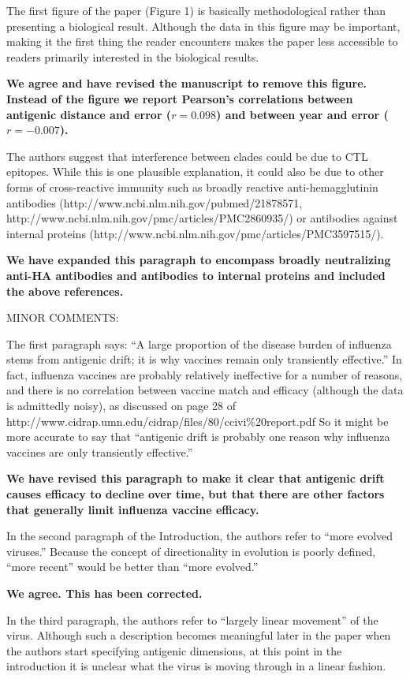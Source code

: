 \documentclass[11pt,oneside,letterpaper]{article}
\begin{document}
The first figure of the paper (Figure 1) is basically methodological rather than presenting a biological result. Although the data in this figure may be important, making it the first thing the reader encounters makes the paper less accessible to readers primarily interested in the biological results.

\textbf{We agree and have revised the manuscript to remove this figure.  Instead of the figure we report Pearson's correlations between antigenic distance and error ($r = 0.098$) and between year and error ($r = -0.007$).}

The authors suggest that interference between clades could be due to CTL epitopes. While this is one plausible explanation, it could also be due to other forms of cross-reactive immunity such as broadly reactive anti-hemagglutinin antibodies (http://www.ncbi.nlm.nih.gov/pubmed/21878571, http://www.ncbi.nlm.nih.gov/pmc/articles/PMC2860935/) or antibodies against internal proteins (http://www.ncbi.nlm.nih.gov/pmc/articles/PMC3597515/).

\textbf{We have expanded this paragraph to encompass broadly neutralizing anti-HA antibodies and antibodies to internal proteins and included the above references.}

MINOR COMMENTS: 

The first paragraph says: ``A large proportion of the disease burden of influenza stems from antigenic drift; it is why vaccines remain only transiently effective.'' In fact, influenza vaccines are probably relatively ineffective for a number of reasons, and there is no correlation between vaccine match and efficacy (although the data is admittedly noisy), as discussed on page 28 of http://www.cidrap.umn.edu/cidrap/files/80/ccivi\%20report.pdf So it might be more accurate to say that ``antigenic drift is probably one reason why influenza vaccines are only transiently effective.''

\textbf{We have revised this paragraph to make it clear that antigenic drift causes efficacy to decline over time, but that there are other factors that generally limit influenza vaccine efficacy.}

In the second paragraph of the Introduction, the authors refer to ``more evolved viruses.'' Because the concept of directionality in evolution is poorly defined, ``more recent'' would be better than ``more evolved.''

\textbf{We agree. This has been corrected.}

In the third paragraph, the authors refer to ``largely linear movement'' of the virus. Although such a description becomes meaningful later in the paper when the authors start specifying antigenic dimensions, at this point in the introduction it is unclear what the virus is moving through in a linear fashion.
\end{document}

